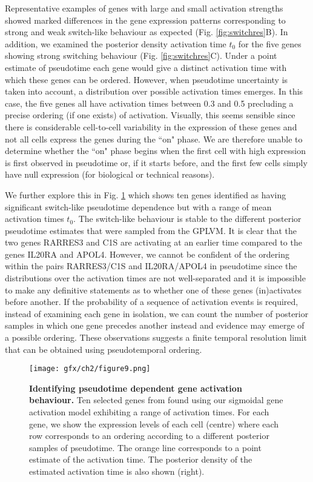 Representative examples of genes with large and small activation strengths showed marked differences in the gene expression patterns corresponding  to strong and weak switch-like behaviour as expected (Fig. \ref{fig:switchres}B). In addition, we examined the posterior density activation time $t_0$ for the five genes showing strong switching behaviour (Fig. \ref{fig:switchres}C). Under a point estimate of pseudotime each gene would give a distinct activation time with which these genes can be ordered. However, when pseudotime uncertainty is taken into account, a distribution over possible activation times emerges. In this case, the five genes all have activation times between 0.3 and 0.5 precluding a precise ordering (if one exists) of activation. Visually, this seems sensible since there is considerable cell-to-cell variability in the expression of these genes and not all cells express the genes during the ``on" phase. We are therefore unable to determine whether the ``on" phase begins when the first cell with high expression is first observed in pseudotime or, if it starts before, and the first few cells simply have null expression (for biological or technical reasons).

We further explore this in Fig. \ref{fig:switchres2} which shows ten genes identified as having significant switch-like pseudotime dependence but with a range of mean activation times $t_0$. The switch-like behaviour is stable to the different posterior pseudotime estimates that were sampled from the GPLVM. It is clear that the two genes RARRES3 and C1S are activating at an earlier time compared to the genes IL20RA and APOL4. However, we cannot be confident of the ordering within the pairs RARRES3/C1S and IL20RA/APOL4 in pseudotime since the distributions over the activation times are not well-separated and it is impossible to make any definitive statements as to whether one of these genes (in)activates before another. If the probability of a sequence of activation events is required, instead of examining each gene in isolation, we can count the number of posterior samples in which one gene precedes another instead and evidence may emerge of a possible ordering. These observations suggests a finite temporal resolution limit that can be obtained using pseudotemporal ordering.

\begin{figure}[h]
\centering
	\texttt{[image: gfx/ch2/figure9.png]}
\caption{ {\bf Identifying pseudotime dependent gene activation behaviour.} Ten selected genes from \cite{Trapnell2014} found using our  sigmoidal gene activation model exhibiting a range of activation times. For each gene, we show the expression levels of each cell (centre) where each row corresponds to an ordering according to a different posterior samples of pseudotime. The orange line corresponds to a point estimate of the activation time. The posterior density of the estimated activation time is also shown (right).
} \label{fig:switchres2}
\end{figure}

